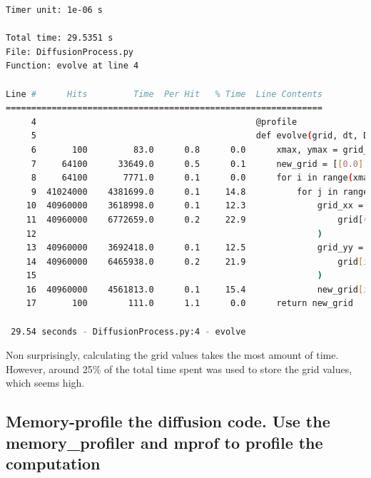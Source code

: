 \documentclass[a4paper,12pt]{article}
\begin{document}
\begin{lstlisting}[language=bash,basicstyle=\tiny\ttfamily]
Timer unit: 1e-06 s

Total time: 29.5351 s
File: DiffusionProcess.py
Function: evolve at line 4

Line #      Hits         Time  Per Hit   % Time  Line Contents
==============================================================
     4                                           @profile
     5                                           def evolve(grid, dt, D=1.0):
     6       100         83.0      0.8      0.0      xmax, ymax = grid_shape
     7     64100      33649.0      0.5      0.1      new_grid = [[0.0] * ymax for x in range(xmax)]
     8     64100       7771.0      0.1      0.0      for i in range(xmax):
     9  41024000    4381699.0      0.1     14.8          for j in range(ymax):
    10  40960000    3618998.0      0.1     12.3              grid_xx = (
    11  40960000    6772659.0      0.2     22.9                  grid[(i + 1) % xmax][j] + grid[(i - 1) % xmax][j] - 2.0 * grid[i][j]
    12                                                       )
    13  40960000    3692418.0      0.1     12.5              grid_yy = (
    14  40960000    6465938.0      0.2     21.9                  grid[i][(j + 1) % ymax] + grid[i][(j - 1) % ymax] - 2.0 * grid[i][j]
    15                                                       )
    16  40960000    4561813.0      0.1     15.4              new_grid[i][j] = grid[i][j] + D * (grid_xx + grid_yy) * dt
    17       100        111.0      1.1      0.0      return new_grid

 29.54 seconds - DiffusionProcess.py:4 - evolve
\end{lstlisting}

Non surprisingly, calculating the grid values takes the most amount of time.
However, around 25\% of the total time spent was used to store the grid values, which seems high.

\subsection{Memory-profile the diffusion code. Use the memory\_profiler and mprof to profile the computation}
\end{document}
